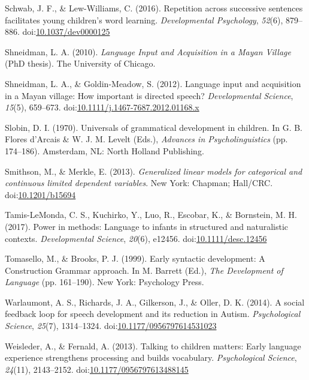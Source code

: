 \documentclass[,man,floatsintext]{apa6}
\begin{document}
\hypertarget{ref-schwab2016repetition}{}
Schwab, J. F., \& Lew-Williams, C. (2016). Repetition across successive
sentences facilitates young children's word learning.
\emph{Developmental Psychology}, \emph{52}(6), 879--886.
doi:\href{https://doi.org/10.1037/dev0000125}{10.1037/dev0000125}

\hypertarget{ref-shneidman2010language}{}
Shneidman, L. A. (2010). \emph{Language Input and Acquisition in a Mayan
Village} (PhD thesis). The University of Chicago.

\hypertarget{ref-shneidman2012language}{}
Shneidman, L. A., \& Goldin-Meadow, S. (2012). Language input and
acquisition in a Mayan village: How important is directed speech?
\emph{Developmental Science}, \emph{15}(5), 659--673.
doi:\href{https://doi.org/10.1111/j.1467-7687.2012.01168.x}{10.1111/j.1467-7687.2012.01168.x}

\hypertarget{ref-slobin1970universals}{}
Slobin, D. I. (1970). Universals of grammatical development in children.
In G. B. Flores d'Arcais \& W. J. M. Levelt (Eds.), \emph{Advances in
Psycholinguistics} (pp. 174--186). Amsterdam, NL: North Holland
Publishing.

\hypertarget{ref-smithson2013generalized}{}
Smithson, M., \& Merkle, E. (2013). \emph{Generalized linear models for
categorical and continuous limited dependent variables}. New York:
Chapman; Hall/CRC.
doi:\href{https://doi.org/10.1201/b15694}{10.1201/b15694}

\hypertarget{ref-tamislemonda2017power}{}
Tamis-LeMonda, C. S., Kuchirko, Y., Luo, R., Escobar, K., \& Bornstein,
M. H. (2017). Power in methods: Language to infants in structured and
naturalistic contexts. \emph{Developmental Science}, \emph{20}(6),
e12456.
doi:\href{https://doi.org/10.1111/desc.12456}{10.1111/desc.12456}

\hypertarget{ref-tomasello1999early}{}
Tomasello, M., \& Brooks, P. J. (1999). Early syntactic development: A
Construction Grammar approach. In M. Barrett (Ed.), \emph{The
Development of Language} (pp. 161--190). New York: Psychology Press.

\hypertarget{ref-warlaumont2014social}{}
Warlaumont, A. S., Richards, J. A., Gilkerson, J., \& Oller, D. K.
(2014). A social feedback loop for speech development and its reduction
in Autism. \emph{Psychological Science}, \emph{25}(7), 1314--1324.
doi:\href{https://doi.org/10.1177/0956797614531023}{10.1177/0956797614531023}

\hypertarget{ref-weisleder2013talking}{}
Weisleder, A., \& Fernald, A. (2013). Talking to children matters: Early
language experience strengthens processing and builds vocabulary.
\emph{Psychological Science}, \emph{24}(11), 2143--2152.
doi:\href{https://doi.org/10.1177/0956797613488145}{10.1177/0956797613488145}
\end{document}
